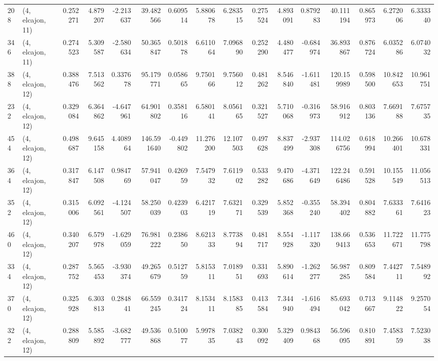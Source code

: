 \begin{tabular}{llrrrrrrrrrrrrrr}
208 &  (4, elcajon, 11) &   0.252271 &   4.879207 &  -2.213637 &    39.482566 &   0.609514 &   5.880678 &   6.283515 &  0.275524 &   4.893091 &   0.879283 &    40.111194 &  0.865973 &   6.272006 &   6.333340 \\
346 &  (4, elcajon, 11) &   0.274523 &   5.309587 &  -2.580634 &    50.365847 &   0.501878 &   6.611064 &   7.096890 &  0.252290 &   4.480477 &  -0.684974 &    36.893867 &  0.876724 &   6.035286 &   6.074032 \\
388 &  (4, elcajon, 12) &   0.388476 &   7.513562 &   0.337678 &    95.179771 &   0.058665 &   9.750166 &   9.756012 &  0.481262 &   8.546840 &  -1.611481 &   120.159989 &  0.598500 &  10.842653 &  10.961751 \\
232 &  (4, elcajon, 12) &   0.329084 &   6.364862 &  -4.647961 &    64.901802 &   0.358116 &   6.580141 &   8.056165 &  0.321527 &   5.710068 &  -0.316973 &    58.916912 &  0.803136 &   7.669188 &   7.675735 \\
454 &  (4, elcajon, 12) &   0.498687 &   9.645158 &   4.408964 &   146.591640 &  -0.449802 &  11.276200 &  12.107503 &  0.497628 &   8.837499 &  -2.937308 &   114.026756 &  0.618994 &  10.266401 &  10.678331 \\
364 &  (4, elcajon, 12) &   0.317847 &   6.147508 &   0.984769 &    57.941047 &   0.426959 &   7.547932 &   7.611902 &  0.533282 &   9.470686 &  -4.371649 &   122.246486 &  0.591528 &  10.155549 &  11.056513 \\
352 &  (4, elcajon, 12) &   0.315006 &   6.092561 &  -4.124507 &    58.250039 &   0.423903 &   6.421719 &   7.632171 &  0.329539 &   5.852368 &  -0.355240 &    58.394402 &  0.804882 &   7.633361 &   7.641623 \\
460 &  (4, elcajon, 12) &   0.340207 &   6.579978 &  -1.629059 &    76.981222 &   0.238650 &   8.621333 &   8.773894 &  0.481717 &   8.554928 &  -1.117320 &   138.669413 &  0.536653 &  11.722671 &  11.775798 \\
334 &  (4, elcajon, 12) &   0.287752 &   5.565453 &  -3.930374 &    49.265679 &   0.512759 &   5.815311 &   7.018951 &  0.331693 &   5.890614 &  -1.262277 &    56.987285 &  0.809584 &   7.442711 &   7.548992 \\
370 &  (4, elcajon, 12) &   0.325928 &   6.303813 &   0.284841 &    66.559245 &   0.341724 &   8.153411 &   8.158385 &  0.413584 &   7.344940 &  -1.616494 &    85.693042 &  0.713667 &   9.114822 &   9.257054 \\
322 &  (4, elcajon, 12) &   0.288809 &   5.585892 &  -3.682777 &    49.536868 &   0.510077 &   5.997835 &   7.038243 &  0.300092 &   5.329409 &   0.984368 &    56.596095 &  0.810891 &   7.458359 &   7.523038 \\

\end{tabular}
